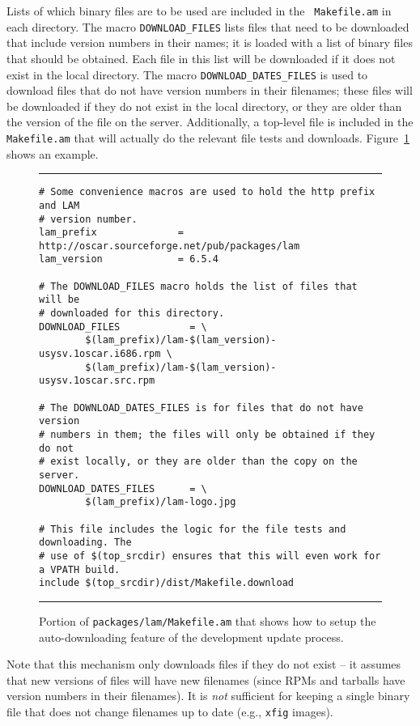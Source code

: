 Lists of which binary files are to be used are included in the {\tt
  Makefile.am} in each directory.  The macro {\tt DOWNLOAD\_\-FILES}
lists files that need to be downloaded that include version numbers in
their names; it is loaded with a list of binary files that should be
obtained.  Each file in this list will be downloaded if it does not
exist in the local directory.  
%
The macro {\tt DOWNLOAD\_\-DATES\_\-FILES} is used to download files
that do not have version numbers in their filenames; these files will
be downloaded if they do not exist in the local directory, or they are
older than the version of the file on the server.
%
Additionally, a top-level file is included in the {\tt Makefile.am}
that will actually do the relevant file tests and downloads.
%
Figure~\ref{fig:makefile-bin-download} shows an example.

\begin{figure}[tbp]
  \begin{center}
\hrule
\vspace{5pt}
\begin{verbatim}
# Some convenience macros are used to hold the http prefix and LAM
# version number.
lam_prefix              = http://oscar.sourceforge.net/pub/packages/lam
lam_version             = 6.5.4

# The DOWNLOAD_FILES macro holds the list of files that will be
# downloaded for this directory.
DOWNLOAD_FILES            = \
        $(lam_prefix)/lam-$(lam_version)-usysv.1oscar.i686.rpm \
        $(lam_prefix)/lam-$(lam_version)-usysv.1oscar.src.rpm

# The DOWNLOAD_DATES_FILES is for files that do not have version
# numbers in them; the files will only be obtained if they do not
# exist locally, or they are older than the copy on the server.
DOWNLOAD_DATES_FILES      = \
        $(lam_prefix)/lam-logo.jpg

# This file includes the logic for the file tests and downloading. The
# use of $(top_srcdir) ensures that this will even work for a VPATH build.
include $(top_srcdir)/dist/Makefile.download
\end{verbatim}
\vspace{5pt}
\hrule
    \caption{Portion of {\tt packages/lam/Makefile.am} that shows how to setup the auto-downloading feature of the development update process.}
    \label{fig:makefile-bin-download}
  \end{center}
\end{figure}

Note that this mechanism only downloads files if they do not exist --
it assumes that new versions of files will have new filenames (since
RPMs and tarballs have version numbers in their filenames).  It is
{\em not} sufficient for keeping a single binary file that does not
change filenames up to date (e.g., {\tt xfig} images).

